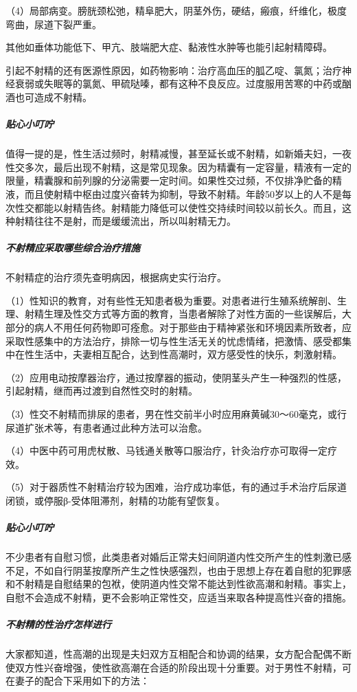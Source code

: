 （4）局部病变。膀胱颈松弛，精阜肥大，阴茎外伤，硬结，瘢痕，纤维化，极度弯曲，尿道下裂严重。

其他如垂体功能低下、甲亢、肢端肥大症、黏液性水肿等也能引起射精障碍。

引起不射精的还有医源性原因，如药物影响：治疗高血压的胍乙啶、氯氮；治疗神经衰弱或失眠等的氯氮、甲硫哒嗪，都有这种不良反应。过度服用苦寒的中药或酗酒也可造成不射精。

\subparagraph{贴心小叮咛}

值得一提的是，性生活过频时，射精减慢，甚至延长或不射精，如新婚夫妇，一夜性交多次，最后出现不射精，这是常见现象。因为精囊有一定容量，精液有一定的限量，精囊腺和前列腺的分泌需要一定时间。如果性交过频，不仅排净贮备的精液，而且使射精中枢由过度兴奋转为抑制，导致不射精。年龄50岁以上的人不是每次性交都能以射精告终。射精能力降低可以使性交持续时间较以前长久。而且，这种射精往往不是射，而是缓缓流出，所以叫射精无力。

\subparagraph{不射精应采取哪些综合治疗措施}

不射精症的治疗须先查明病因，根据病史实行治疗。

（1）性知识的教育，对有些性无知患者极为重要。对患者进行生殖系统解剖、生理、射精生理及性交方式等方面的教育，当患者解除了对性方面的一些误解后，大部分的病人不用任何药物即可痊愈。对于那些由于精神紧张和环境因素所致者，应采取性感集中的方法治疗，排除一切与性生活无关的忧虑情绪，把激情、感受都集中在性生活中，夫妻相互配合，达到性高潮时，双方感受性的快乐，刺激射精。

（2）应用电动按摩器治疗，通过按摩器的振动，使阴茎头产生一种强烈的性感，引起射精，继而再过渡到自然性交时的射精。

（3）性交不射精而排尿的患者，男在性交前半小时应用麻黄碱30～60毫克，或行尿道扩张术等，有患者通过此种方法可以治愈。

（4）中医中药可用虎杖散、马钱通关散等口服治疗，针灸治疗亦可取得一定疗效。

（5）对于器质性不射精治疗较为困难，治疗成功率低，有的通过手术治疗后尿道闭锁，或停服β-受体阻滞剂，射精的功能有望恢复。

\subparagraph{贴心小叮咛}

不少患者有自慰习惯，此类患者对婚后正常夫妇间阴道内性交所产生的性刺激已感不足，不如自行阴茎按摩所产生之性快感强烈，也由于思想上存在着自慰的犯罪感和不射精是自慰结果的包袱，使阴道内性交常不能达到性欲高潮和射精。事实上，自慰不会造成不射精，更不会影响正常性交，应适当来取各种提高性兴奋的措施。

\subparagraph{不射精的性治疗怎样进行}

大家都知道，性高潮的出现是夫妇双方互相配合和协调的结果，女方配合配偶不断使双方性兴奋增强，使性欲高潮在合适的阶段出现十分重要。对于男性不射精，可在妻子的配合下采用如下的方法：

